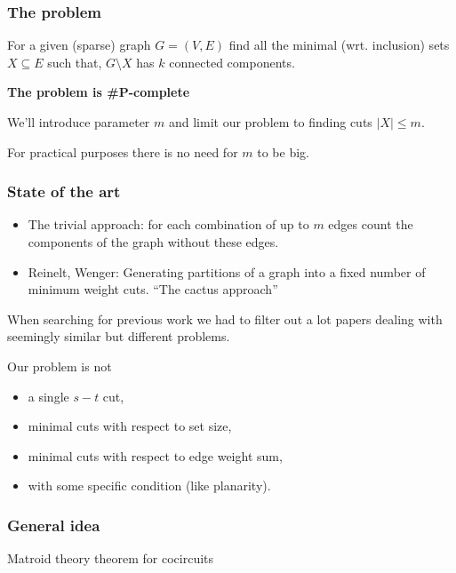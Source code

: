 \documentclass[10pt]{beamer}
\begin{document}
\begin{frame}[fragile]
	\frametitle{The problem}


	For a given (sparse) graph $G = (V, E)$ find all the minimal (wrt.
	inclusion) sets $X \subseteq E$ such that, $G \setminus X$ has $k$
	connected components. \\

	\bigskip

	\bigskip
	\textbf{The problem is \#P-complete}

	We'll introduce parameter $m$ and limit our problem to finding cuts $\lvert
	X \rvert \leq m$.

	\smallskip

    For practical purposes there is no need for $m$ to be big.


\end{frame}

\begin{frame}[fragile]
	\frametitle{State of the art}

	\begin{itemize}
		\item The trivial approach: for each combination of up to $m$ edges count
    	the components of the graph without these edges.

		\item Reinelt, Wenger: Generating partitions
    	of a graph into a fixed number of minimum weight cuts. ``The cactus approach''
	\end{itemize}

    \bigskip

    When searching for previous work we had to filter out a lot papers
    dealing with seemingly similar but different problems.

    \medskip

	Our problem is not
	\begin{itemize}
		\item a single $s{-}t$ cut,
		\item minimal cuts with respect to set size,
		\item minimal cuts with respect to edge weight sum,
		\item with some specific condition (like planarity).
	\end{itemize}

\end{frame}

\begin{frame}[fragile]
    \frametitle{General idea}

     Matroid theory theorem for cocircuits

\end{frame}
\end{document}
